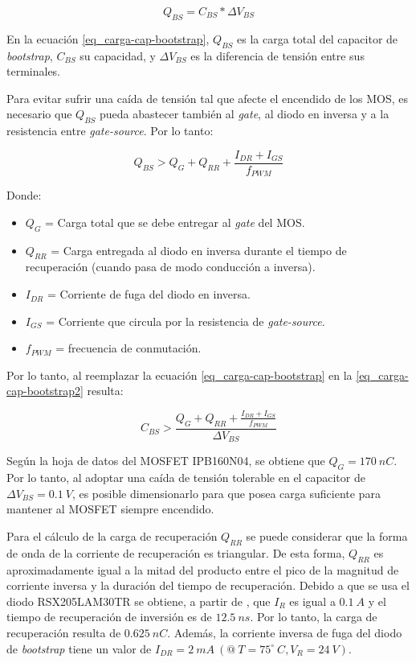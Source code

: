 \begin{equation} \label{eq_carga-cap-bootstrap}
	Q_{BS}=C_{BS}*\Delta V_{BS}
\end{equation}

\noindent En la ecuación \ref{eq_carga-cap-bootstrap}, $Q_{BS}$ es la carga total del capacitor de \textsl{bootstrap}, $C_{BS}$ su capacidad, y $\Delta V_{BS}$ es la diferencia de  tensión entre sus terminales. 

\noindent Para evitar sufrir una caída de tensión tal que afecte el encendido de los MOS, es necesario que $Q_{BS}$ pueda abastecer también al \textsl{gate}, al diodo en inversa y a la resistencia entre \textsl{gate-source}. Por lo tanto:

\begin{equation} \label{eq_carga-cap-bootstrap2}
	Q_{BS} > Q_G + Q_{RR} + \frac{I_{DR}+I_{GS}}{f_{PWM}}
\end{equation}

\noindent Donde:
\begin{itemize}
	\item $Q_G$ = Carga total que se debe entregar al \textsl{gate} del MOS.
	\item $Q_{RR}$ = Carga entregada al diodo en inversa durante el tiempo de recuperación (cuando pasa de modo conducción a inversa).
	\item $I_{DR}$ = Corriente de fuga del diodo en inversa.
	\item $I_{GS}$ = Corriente que circula por la resistencia de \textsl{gate-source}.
	\item $f_{PWM}$ = frecuencia de conmutación.
\end{itemize}


\noindent Por lo tanto, al reemplazar la ecuación \ref{eq_carga-cap-bootstrap} en la \ref{eq_carga-cap-bootstrap2} resulta:


\begin{equation} \label{eq_cap-bootstrap}
	C_{BS} > \frac{Q_G+Q_{RR} + \frac{I_{DR}+I_{GS}}{f_{PWM}}}{\Delta V_{BS}}
\end{equation}

\noindent Según la hoja de datos \cite{IPB160N04} del MOSFET IPB160N04, se obtiene que $Q_G= 170\:nC$. Por lo tanto, al adoptar una caída de tensión tolerable en el capacitor de $\Delta V_{BS} = 0.1\:V$, es posible dimensionarlo para que posea carga suficiente para mantener al MOSFET siempre encendido.

\noindent Para el cálculo de la carga de recuperación $Q_{RR}$ se puede considerar que la forma de onda de la corriente de recuperación es triangular. De esta forma,  $Q_{RR}$ es aproximadamente igual a la mitad del producto entre el pico de la magnitud de corriente inversa y la duración del tiempo de recuperación.  Debido a que se usa el diodo RSX205LAM30TR se obtiene, a partir de \cite{RSX205LAM30}, que  $I_R$ es igual a $0.1\:A$  y  el tiempo de recuperación de inversión es de $12.5\:ns$. Por lo tanto, la carga de recuperación resulta de $0.625\:nC$. Además, la corriente inversa de fuga del diodo de \textsl{bootstrap} tiene un valor de $I_{DR} =2 \:mA\:(@\: T=75^{\circ}\:C, V_R= 24\:V)$.

